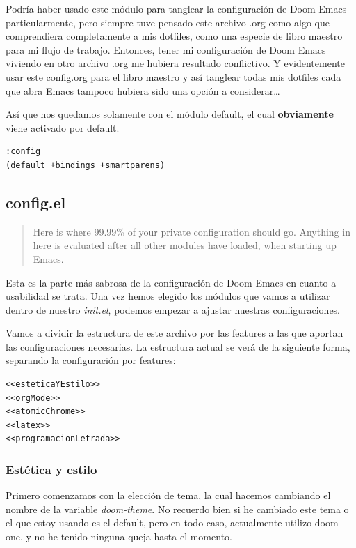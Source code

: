 \documentclass[11pt]{article}
\begin{document}
Podría haber usado este módulo para tanglear la configuración de Doom Emacs particularmente, pero siempre tuve pensado este archivo .org como algo que comprendiera completamente a mis dotfiles, como una especie de libro maestro para mi flujo de trabajo. Entonces, tener mi configuración de Doom Emacs viviendo en otro archivo .org me hubiera resultado conflictivo. Y evidentemente usar este config.org para el libro maestro y así tanglear todas mis dotfiles cada que abra Emacs tampoco hubiera sido una opción a considerar\ldots{}

Así que nos quedamos solamente con el módulo default, el cual \textbf{obviamente} viene activado por default.

\begin{verbatim}
:config
(default +bindings +smartparens)

\end{verbatim}
\subsection{config.el}
\label{sec:orgbccab63}

\begin{quote}
Here is where 99.99\% of your private configuration should go. Anything in here is evaluated after all other modules have loaded, when starting up Emacs.
\end{quote}

Esta es la parte más sabrosa de la configuración de Doom Emacs en cuanto a usabilidad se trata. Una vez hemos elegido los módulos que vamos a utilizar dentro de nuestro \emph{init.el}, podemos empezar a ajustar nuestras configuraciones.

Vamos a dividir la estructura de este archivo por las features a las que aportan las configuraciones necesarias. La estructura actual se verá de la siguiente forma, separando la configuración por features:

\begin{verbatim}
<<esteticaYEstilo>>
<<orgMode>>
<<atomicChrome>>
<<latex>>
<<programacionLetrada>>
\end{verbatim}
\subsubsection{Estética y estilo}
\label{sec:org3b52117}

Primero comenzamos con la elección de tema, la cual hacemos cambiando el nombre de la variable \emph{doom-theme}. No recuerdo bien si he cambiado este tema o el que estoy usando es el default, pero en todo caso, actualmente utilizo doom-one, y no he tenido ninguna queja hasta el momento.
\end{document}
